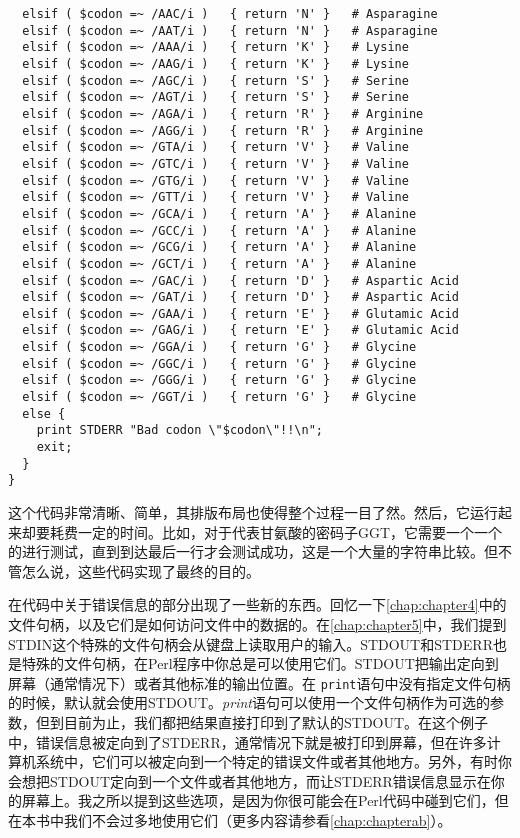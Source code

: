 \begin{lstlisting}
  elsif ( $codon =~ /AAC/i )   { return 'N' }   # Asparagine
  elsif ( $codon =~ /AAT/i )   { return 'N' }   # Asparagine
  elsif ( $codon =~ /AAA/i )   { return 'K' }   # Lysine
  elsif ( $codon =~ /AAG/i )   { return 'K' }   # Lysine
  elsif ( $codon =~ /AGC/i )   { return 'S' }   # Serine
  elsif ( $codon =~ /AGT/i )   { return 'S' }   # Serine
  elsif ( $codon =~ /AGA/i )   { return 'R' }   # Arginine
  elsif ( $codon =~ /AGG/i )   { return 'R' }   # Arginine
  elsif ( $codon =~ /GTA/i )   { return 'V' }   # Valine
  elsif ( $codon =~ /GTC/i )   { return 'V' }   # Valine
  elsif ( $codon =~ /GTG/i )   { return 'V' }   # Valine
  elsif ( $codon =~ /GTT/i )   { return 'V' }   # Valine
  elsif ( $codon =~ /GCA/i )   { return 'A' }   # Alanine
  elsif ( $codon =~ /GCC/i )   { return 'A' }   # Alanine
  elsif ( $codon =~ /GCG/i )   { return 'A' }   # Alanine
  elsif ( $codon =~ /GCT/i )   { return 'A' }   # Alanine
  elsif ( $codon =~ /GAC/i )   { return 'D' }   # Aspartic Acid
  elsif ( $codon =~ /GAT/i )   { return 'D' }   # Aspartic Acid
  elsif ( $codon =~ /GAA/i )   { return 'E' }   # Glutamic Acid
  elsif ( $codon =~ /GAG/i )   { return 'E' }   # Glutamic Acid
  elsif ( $codon =~ /GGA/i )   { return 'G' }   # Glycine
  elsif ( $codon =~ /GGC/i )   { return 'G' }   # Glycine
  elsif ( $codon =~ /GGG/i )   { return 'G' }   # Glycine
  elsif ( $codon =~ /GGT/i )   { return 'G' }   # Glycine
  else {
    print STDERR "Bad codon \"$codon\"!!\n";
    exit;
  }
}
\end{lstlisting}

这个代码非常清晰、简单，其排版布局也使得整个过程一目了然。然后，它运行起来却要耗费一定的时间。比如，对于代表甘氨酸的密码子GGT，它需要一个一个的进行测试，直到到达最后一行才会测试成功，这是一个大量的字符串比较。但不管怎么说，这些代码实现了最终的目的。

在代码中关于错误信息的部分出现了一些新的东西。回忆一下\autoref{chap:chapter4}中的文件句柄，以及它们是如何访问文件中的数据的。在\autoref{chap:chapter5}中，我们提到STDIN这个特殊的文件句柄会从键盘上读取用户的输入。STDOUT和STDERR也是特殊的文件句柄，在Perl程序中你总是可以使用它们。STDOUT把输出定向到屏幕（通常情况下）或者其他标准的输出位置。在 \verb|print|语句中没有指定文件句柄的时候，默认就会使用STDOUT。\textit{print}语句可以使用一个文件句柄作为可选的参数，但到目前为止，我们都把结果直接打印到了默认的STDOUT。在这个例子中，错误信息被定向到了STDERR，通常情况下就是被打印到屏幕，但在许多计算机系统中，它们可以被定向到一个特定的错误文件或者其他地方。另外，有时你会想把STDOUT定向到一个文件或者其他地方，而让STDERR错误信息显示在你的屏幕上。我之所以提到这些选项，是因为你很可能会在Perl代码中碰到它们，但在本书中我们不会过多地使用它们（更多内容请参看\autoref{chap:chapterab}）。

